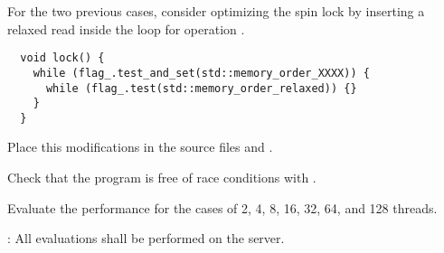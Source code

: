 For the two previous cases, consider optimizing the spin lock by inserting a relaxed read
inside the loop for operation .

\begin{lstlisting}
  void lock() {
    while (flag_.test_and_set(std::memory_order_XXXX)) {
      while (flag_.test(std::memory_order_relaxed)) {}
    }
  }
\end{lstlisting}

Place this modifications in the source files 
 and
.

Check that the program is free of race conditions with .

Evaluate the performance for the cases of 2, 4, 8, 16, 32, 64, and 128 threads.

: All evaluations shall be performed on the  server.
